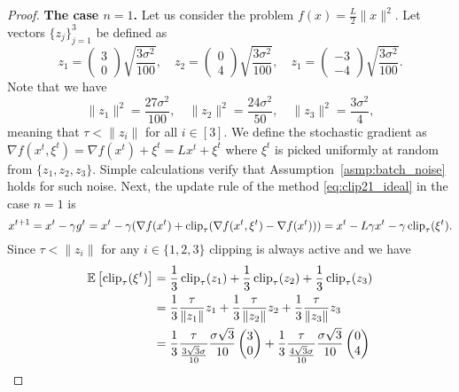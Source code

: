 \documentclass[a4paper,11pt]{article}
\begin{document}
\begin{proof}

    {\bf The case $n=1$.}  Let us consider the problem $f(x) = \frac{L}{2}\|x\|^2$. Let vectors $\{z_j\}_{j=1}^3$ be defined as
    \[
    z_1 = \begin{pmatrix}
        3 \\ 0
    \end{pmatrix}\sqrt{\frac{3\sigma^2}{100}}, \quad 
    z_2 = \begin{pmatrix}
        0 \\ 4
    \end{pmatrix}\sqrt{\frac{3\sigma^2}{100}}, \quad 
    z_1 = \begin{pmatrix}
        -3 \\ -4
    \end{pmatrix}\sqrt{\frac{3\sigma^2}{100}}.
    \]
    Note that we have 
    \[
    \|z_1\|^2 = \frac{27\sigma^2}{100}, \quad \|z_2\|^2 = \frac{24\sigma^2}{50}, \quad \|z_3\|^2 = \frac{3\sigma^2}{4},
    \]
    meaning that $\tau < \|z_i\|$ for all $i\in[3]$. We define the stochastic gradient  as $\nabla f(x^t,\xi^t) = \nabla f(x^t) + \xi^t =  Lx^t + \xi^t$ where $\xi^t$ is picked uniformly at random from $\{z_1, z_2, z_3\}$. Simple calculations verify that Assumption~\ref{asmp:batch_noise} holds for such noise. Next, the update rule of the method \eqref{eq:clip21_ideal} in the case $n=1$ is
    \[
    x^{t+1} = x^t - \gamma g^t = x^t - \gamma(\nabla f(x^t) + \operatorname{clip}_{\tau}(\nabla f(x^t,\xi^t)-\nabla f(x^t))) = x^t - L\gamma x^t - \gamma\operatorname{clip}_{\tau}(\xi^t).
    \]
    Since $\tau < \|z_i\|$ for any $i\in\{1,2,3\}$ clipping is always active and we have 
    \begin{align*}
        \E{\clip_{\tau}(\xi^t)} &= \frac{1}{3}\clip_{\tau}(z_1) 
        + \frac{1}{3}\clip_{\tau}(z_2)
        + \frac{1}{3}\clip_{\tau}(z_3)\\
        &= \frac{1}{3}\frac{\tau}{\|z_1\|}z_1
        +  \frac{1}{3}\frac{\tau}{\|z_2\|}z_2
        +  \frac{1}{3}\frac{\tau}{\|z_3\|}z_3\\
        &= \frac{1}{3}\frac{\tau}{\frac{3\sqrt{3}\sigma}{10}}\frac{\sigma\sqrt{3}}{10}\begin{pmatrix}
            3 \\ 0
        \end{pmatrix}
        + \frac{1}{3}\frac{\tau}{\frac{4\sqrt{3}\sigma}{10}}\frac{\sigma\sqrt{3}}{10}\begin{pmatrix}
            0 \\ 4
        \end{pmatrix}

\end{align*}
\end{proof}
\end{document}
